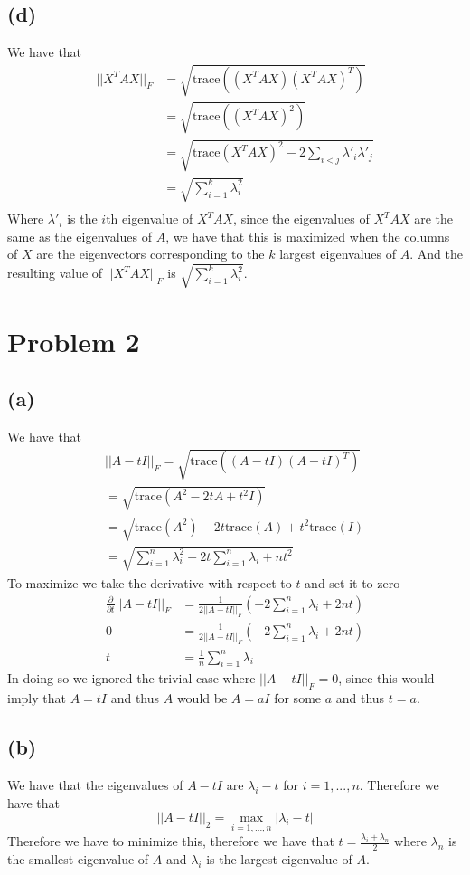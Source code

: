 \documentclass[11pt]{article}
\begin{document}
\subsection*{(d)}
We have that 
\begin{align*}
    ||X^TAX||_F &= \sqrt{\text{trace}\left((X^TAX)(X^TAX)^T\right)}\\
    &= \sqrt{\text{trace}\left((X^TAX)^2\right)}\\
    &= \sqrt{\text{trace}(X^TAX)^2-2\sum_{i<j}\lambda'_i\lambda'_j}\\
    &=\sqrt{\sum_{i=1}^k\lambda_i^2}\\
\end{align*}
Where $\lambda'_i$ is the $i$th eigenvalue of $X^TAX$, since the 
eigenvalues of $X^TAX$ are the same as the eigenvalues of $A$, we have that this is maximized when 
the columns of $X$ are the eigenvectors corresponding to the $k$ largest eigenvalues of $A$. And the resulting 
value of $||X^TAX||_F$ is $\sqrt{\sum_{i=1}^k\lambda_i^2}$.
\section*{Problem 2}
\subsection*{(a)}
We have that 
\begin{align*}
    ||A-tI||_F = \sqrt{\text{trace}\left((A-tI)(A-tI)^T\right)}\\
    =\sqrt{\text{trace}(A^2-2tA+t^2I)}\\
    =\sqrt{\text{trace}(A^2)-2t\text{trace}(A)+t^2\text{trace}(I)}\\
    =\sqrt{\sum_{i=1}^n\lambda_i^2-2t\sum_{i=1}^n\lambda_i+nt^2}
\end{align*}
To maximize we take the derivative with respect to $t$ and set it to zero
\begin{align*}
    \frac{\partial}{\partial t}||A-tI||_F &= \frac{1}{2||A-tI||_F}\left(-2\sum_{i=1}^n\lambda_i+2nt\right)\\
    0 &= \frac{1}{2||A-tI||_F}\left(-2\sum_{i=1}^n\lambda_i+2nt\right)\\
    t &= \boxed{\frac{1}{n}\sum_{i=1}^n\lambda_i}
\end{align*}
In doing so we ignored the trivial case where $||A-tI||_F=0$, since this would imply that $A=tI$ and thus $A$ would be $A=aI$ for some $a$ and thus $t=a$. 
\subsection*{(b)}
We have that the eigenvalues of $A-tI$ are $\lambda_i-t$ for $i=1,...,n$. Therefore we have that
$$||A-tI||_2 = \max_{i=1,...,n}|\lambda_i-t|$$
Therefore we have to minimize this, therefore we have that 
$t = \boxed{\frac{\lambda_i+\lambda_n}{2}}$ where $\lambda_n$ is the smallest eigenvalue of $A$ and 
$\lambda_i$ is the largest eigenvalue of $A$.
\end{document}
